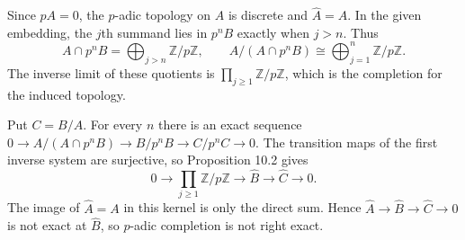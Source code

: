 Since $pA=0$, the $p$-adic topology on $A$ is discrete and $\widehat A=A$. In the given embedding, the $j$th summand lies in $p^nB$ exactly when $j>n$. Thus
\[A\cap p^nB=\bigoplus_{j>n}\mathbb{Z}/p\mathbb{Z},\qquad A/(A\cap p^nB)\cong\bigoplus_{j=1}^n\mathbb{Z}/p\mathbb{Z}.\]
The inverse limit of these quotients is $\prod_{j\ge1}\mathbb{Z}/p\mathbb{Z}$, which is the completion for the induced topology.

Put $C=B/A$. For every $n$ there is an exact sequence $0\to A/(A\cap p^nB)\to B/p^nB\to C/p^nC\to0$. The transition maps of the first inverse system are surjective, so Proposition 10.2 gives
\[0\to\prod_{j\ge1}\mathbb{Z}/p\mathbb{Z}\to\widehat B\to\widehat C\to0.\]
The image of $\widehat A=A$ in this kernel is only the direct sum. Hence $\widehat A\to\widehat B\to\widehat C\to0$ is not exact at $\widehat B$, so $p$-adic completion is not right exact.
